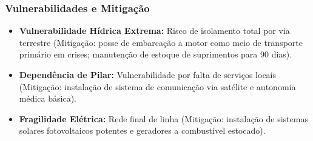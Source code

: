 \subsubsection{Vulnerabilidades e
Mitigação}

\begin{itemize}
\tightlist
\item
  \textbf{Vulnerabilidade Hídrica Extrema:} Risco de isolamento total
  por via terrestre (Mitigação: posse de embarcação a motor como meio de
  transporte primário em crises; manutenção de estoque de suprimentos
  para 90 dias).
\item
  \textbf{Dependência de Pilar:} Vulnerabilidade por falta de serviços
  locais (Mitigação: instalação de sistema de comunicação via satélite e
  autonomia médica básica).
\item
  \textbf{Fragilidade Elétrica:} Rede final de linha (Mitigação:
  instalação de sistemas solares fotovoltaicos potentes e geradores a
  combustível estocado).
\end{itemize}

